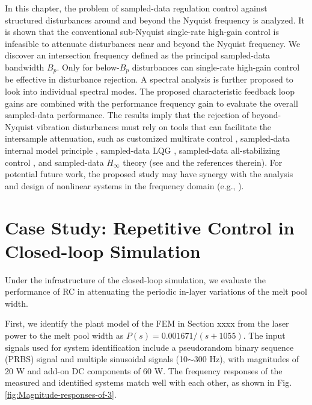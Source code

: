 \documentclass [11pt, proquest] {uwthesis}[2020/02/24]
\begin{document}
In this chapter, the problem of sampled-data regulation control against
structured disturbances around and beyond the Nyquist frequency is
analyzed. It is shown that the conventional sub-Nyquist single-rate
high-gain control is infeasible to attenuate disturbances near and
beyond the Nyquist frequency. We discover an intersection frequency
defined as the principal sampled-data bandwidth $B_{p}$. Only for
below-$B_{p}$ disturbances can single-rate high-gain control be effective
in disturbance rejection. A spectral analysis is further proposed
to look into individual spectral modes. The proposed characteristic
feedback loop gains are combined with the performance frequency gain
to evaluate the overall sampled-data performance. The results imply
that the rejection of beyond-Nyquist vibration disturbances must rely
on tools that can facilitate the intersample attenuation, such as
customized multirate control \cite{XuChen_beyondNyquist15}, sampled-data
internal model principle \cite{Fujioka:2011dy}, sampled-data LQG
\cite{Chen:1991cp}, sampled-data all-stabilizing control \cite{Ravi:1990eo},
and sampled-data $H_{\infty}$ theory (see \cite{Lall:2001cm} and
the references therein). For potential future work, the proposed study
may have synergy with the analysis and design of nonlinear systems
in the frequency domain (e.g., \cite{jing2015frequency,lang2007output,xiao2016frequency}).


\chapter{Case Study: Repetitive Control in Closed-loop Simulation} \label{chap:RC-Closed-loop-Simulation}

Under the infrastructure of the closed-loop simulation, we evaluate
the performance of RC in attenuating the periodic in-layer variations
of the melt pool width.

First, we identify the plant model of the FEM in Section xxxx
from the laser power to the melt pool width as $P(s)=0.001671/(s+1055)$.
The input signals used for system identification include a pseudorandom
binary sequence (PRBS) signal and multiple sinusoidal signals (10$\sim$300
Hz), with magnitudes of 20 W and add-on DC components of 60 W. The
frequency responses of the measured and identified systems match well
with each other, as shown in Fig. \ref{fig:Magnitude-responses-of-3}.
\end{document}
